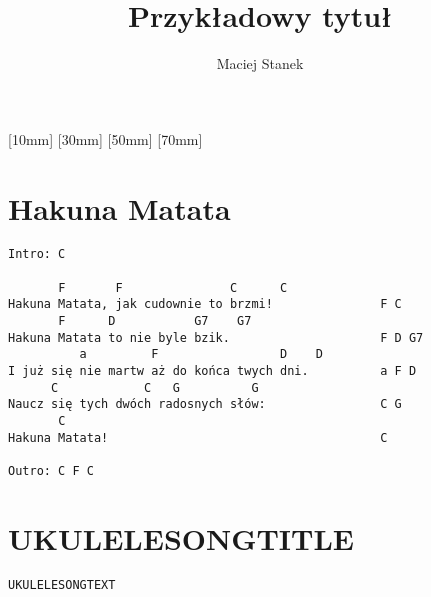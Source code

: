 \documentclass[twoside]{article}
\author{Maciej Stanek}
\title{Przykładowy tytuł}
\begin{document}

[10mm]
[30mm]
[50mm]
[70mm]


\section{Hakuna Matata}
\begin{verbatim}Intro: C

       F       F               C      C
Hakuna Matata, jak cudownie to brzmi!               F C
       F      D           G7    G7
Hakuna Matata to nie byle bzik.                     F D G7
          a         F                 D    D
I już się nie martw aż do końca twych dni.          a F D
      C            C   G          G
Naucz się tych dwóch radosnych słów:                C G
       C
Hakuna Matata!                                      C

Outro: C F C\end{verbatim}

\newpage

\section{UKULELESONGTITLE}
\begin{verbatim}UKULELESONGTEXT\end{verbatim}
\end{document}
